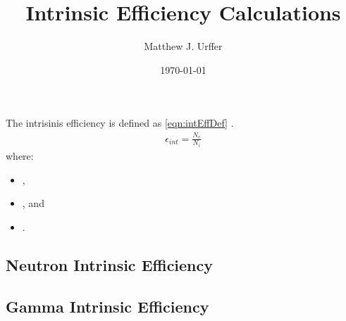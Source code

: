 \documentclass[draftcls,onecolumn]{IEEEtran}
\begin{document}
\title{Intrinsic Efficiency Calculations}
\author{Matthew J. Urffer}
\date{\today}
\maketitle

\printnomenclature
\printindex

\listoftodos
\tableofcontents
\listoffigures
\listoftables
\lstlistoflistings
The intrisinis efficiency is defined as \eqref{eqn:intEffDef} \cite{knoll_radiation_2009}.
\begin{align}
  \epsilon_{int} = \frac{N_c}{N_i}
\end{align}
where:
\begin{itemize}
  \item[] ,
  \item[] , and
  \item[] .
\end{itemize}
\subsection{Neutron Intrinsic Efficiency}

\subsection{Gamma Intrinsic Efficiency}


\end{document}
